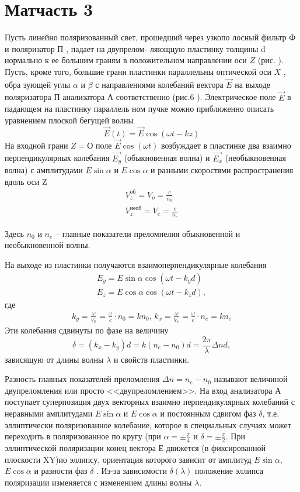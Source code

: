 \section{Матчасть 3}
Пусть линейно поляризованный свет, прошедший через узкопо­
лосный фильтр $\text{Ф}$ и поляризатор $\text{П}$ , падает на двупрелом-
ляющцую пластинку толщины d нормально к ее большим граням в
положительном направлении оси $Z$ (рис. ). Пусть, кроме того,
большие грани пластинки параллельны оптической оси $X$ , обра­
зующей углы $\alpha$ и $\beta$ с направлениями колебаний вектора $\vec{E}$
на выходе поляризатора П анализатора А соответственно
(рис.6 ). Электрическое поле $\vec{E}$ в падающем на пластинку параллель­
ном пучке можно приближенно описать уравнением плоской бегущей
волны 
\begin{equation}
	\vec{E}(t)=\vec{E}\cos(\omega t-kz)
\end{equation}
На входной грани $Z=О$ поле $\vec{E}\cos(\omega t)$ возбуждает
в пластинке два взаимно перпендикулярных колебания $\vec{E_y}$
(обыкновенная волна) и $\vec{E_x}$ (необыкновенная волна) с амплитудами $E\sin\alpha$ и $E\cos\alpha$ и разными скоростями
распространения вдоль оси Z
\begin{gather}
	V_z^{\text{об}}=V_o=\frac{c}{n_0} \\
	V_z^{\text{необ}}=V_e=\frac{c}{n_e}
\end{gather}

Здесь $n_0$ и $n_e$ -- главные показатели преломнелия обыкновенной и необыкновенной волны.

На выходе из пластинки получаются взаимоперпендикулярные колебания
\begin{gather}
	E_y=E\sin\alpha\cos(\omega t -k_yd) \\
	E_z=E\cos\alpha\cos(\omega t -k_zd),
\end{gather}
где
\begin{gather}
	k_y=\frac{\omega}{V_0}=\frac{\omega}{c}\cdot n_0=kn_0, \,
	k_x=\frac{\omega}{V_e}=\frac{\omega}{c}\cdot n_e=kn_e
\end{gather}
Эти колебания сдвинуты по фазе на величину
\begin{equation}
	\delta=(k_x-k_y)d=k(n_e-n_0)d=\frac{2\pi}{\lambda}\Delta nd,
\end{equation}
зависящую от длины волны $\lambda$ и свойств пластинки.

Разность главных показателей преломления $\Delta n=n_e-n_0$
называют величиной двупреломления или просто <<двупреломлением>>.
На вход анализатора А поступает суперпозиция двух векторных
взаимно перпендикулярных колебаний с неравными амплитудами
$E\sin\alpha$ и $E\cos\alpha$ и постоянным сдвигом фаз $\delta$, т.е. эллиптически поляризованное колебание, которое
в специальных случаях может переходить в поляризованное по кру­гу 
(при $\alpha=\pm\frac{\pi}{4}$ и $\delta=\pm\frac{\pi}{2}$. При эллиптической
поляризации конец вектора Е движется (в фиксированной плоскости
XY)ио эллипсу, ориентация которого зависит от амплитуд
$E\sin\alpha$, $E\cos\alpha$ и разности фаз $\delta$ . Из-за
зависимости $\delta(\lambda)$ положение эллипса поляризации изменяется
с изменением длины волны $\lambda$.

